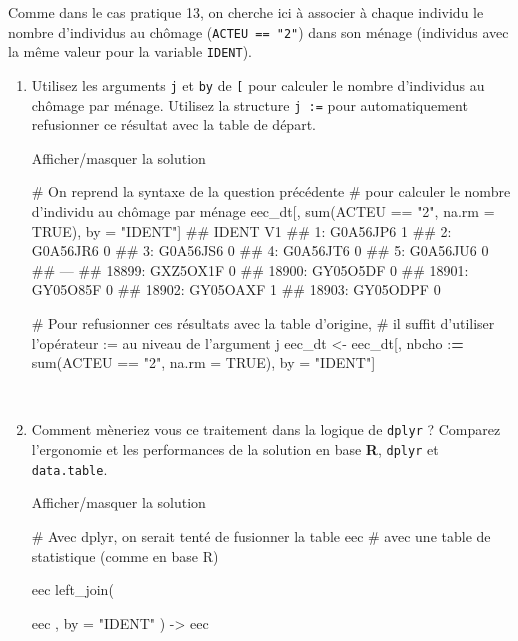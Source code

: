 \documentclass[12pt,]{article}
\newenvironment{Shaded}{}{}
\newcommand{\KeywordTok}[1]{\textcolor[rgb]{0.00,0.00,1.00}{{#1}}}
\newcommand{\DataTypeTok}[1]{{#1}}
\newcommand{\StringTok}[1]{\textcolor[rgb]{0.00,0.50,0.50}{{#1}}}
\newcommand{\CommentTok}[1]{\textcolor[rgb]{0.00,0.50,0.00}{{#1}}}
\newcommand{\OtherTok}[1]{\textcolor[rgb]{1.00,0.25,0.00}{{#1}}}
\newcommand{\ErrorTok}[1]{\textcolor[rgb]{1.00,0.00,0.00}{\textbf{{#1}}}}
\newcommand{\NormalTok}[1]{{#1}}
\begin{document}
Comme dans le cas pratique 13, on cherche ici à associer à chaque
individu le nombre d'individus au chômage (\texttt{ACTEU\ ==\ "2"}) dans
son ménage (individus avec la même valeur pour la variable
\texttt{IDENT}).

\begin{enumerate}
\def\labelenumi{\alph{enumi}.}
\item
  Utilisez les arguments \texttt{j} et \texttt{by} de \texttt{{[}} pour
  calculer le nombre d'individus au chômage par ménage. Utilisez la
  structure \texttt{j\ :=} pour automatiquement refusionner ce résultat
  avec la table de départ.

  Afficher/masquer la solution

  \hypertarget{sol64}{}
\begin{Shaded}
\begin{Highlighting}[]
\CommentTok{# On reprend la syntaxe de la question précédente}
\CommentTok{# pour calculer le nombre d'individu au chômage par ménage}
\NormalTok{eec_dt[, }\KeywordTok{sum}\NormalTok{(ACTEU ==}\StringTok{ "2"}\NormalTok{, }\DataTypeTok{na.rm =} \OtherTok{TRUE}\NormalTok{), by =}\StringTok{ "IDENT"}\NormalTok{]}
\NormalTok{##           IDENT V1}
\NormalTok{##     1: G0A56JP6  1}
\NormalTok{##     2: G0A56JR6  0}
\NormalTok{##     3: G0A56JS6  0}
\NormalTok{##     4: G0A56JT6  0}
\NormalTok{##     5: G0A56JU6  0}
\NormalTok{##    ---            }
\NormalTok{## 18899: GXZ5OX1F  0}
\NormalTok{## 18900: GY05O5DF  0}
\NormalTok{## 18901: GY05O85F  0}
\NormalTok{## 18902: GY05OAXF  1}
\NormalTok{## 18903: GY05ODPF  0}

\CommentTok{# Pour refusionner ces résultats avec la table d'origine,}
\CommentTok{# il suffit d'utiliser l'opérateur := au niveau de l'argument j}
\NormalTok{eec_dt <-}\StringTok{ }\NormalTok{eec_dt[, nbcho :}\ErrorTok{=}\StringTok{ }\KeywordTok{sum}\NormalTok{(ACTEU ==}\StringTok{ "2"}\NormalTok{, }\DataTypeTok{na.rm =} \OtherTok{TRUE}\NormalTok{), by =}\StringTok{ "IDENT"}\NormalTok{]}
\end{Highlighting}
\end{Shaded}

  ~
\item
  Comment mèneriez vous ce traitement dans la logique de \texttt{dplyr}
  ? Comparez l'ergonomie et les performances de la solution en base
  \textbf{R}, \texttt{dplyr} et \texttt{data.table}.

  Afficher/masquer la solution

  \hypertarget{sol65}{}
\begin{Shaded}
\begin{Highlighting}[]
\CommentTok{# Avec dplyr, on serait tenté de fusionner la table eec}
\CommentTok{# avec une table de statistique (comme en base R)}
\NormalTok{eec %>%}\StringTok{ }
\StringTok{  }\KeywordTok{left_join}\NormalTok{(}
\NormalTok{eec %>%}\StringTok{ }\KeywordTok{group_by}\NormalTok{(IDENT) %>%}\StringTok{ }\KeywordTok{summarize}\NormalTok{(}\DataTypeTok{nbcho =} \KeywordTok{n}\NormalTok{())}
\NormalTok{, }\DataTypeTok{by =} \StringTok{"IDENT"}
  \NormalTok{) ->}\StringTok{ }
\StringTok{  }\NormalTok{eec}

}}
\end{Highlighting}
\end{Shaded}
\end{enumerate}
\end{document}
